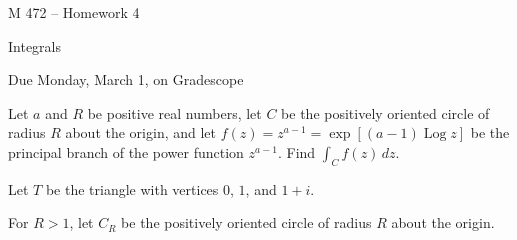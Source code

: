 \documentclass[11pt]{exam}
\newcommand{\ds}{\displaystyle}
\DeclareMathOperator{\Log}{Log}
\begin{document}
\centerline{\Large M 472 -- Homework 4}
\vspace{2ex}
\centerline{\Large Integrals}
\vspace{3ex}
\centerline{Due Monday, March 1, on Gradescope}
\vspace{3ex}
\thispagestyle{empty}
\begin{questions}
  \question Let $a$ and $R$ be positive real numbers, let $C$ be
  the positively oriented circle of radius $R$ about the origin, and
  let $f(z) = z^{a-1} = \exp[(a-1) \Log z]$ be the principal branch of
  the power function $z^{a-1}$. Find $\ds \int_C f(z) \, dz$.
  
  \question Let $T$ be the triangle with vertices $0$, $1$, and
  $1+i$.

  \question For $R>1$, let $C_R$ be the positively oriented circle of
  radius $R$ about the origin.
  
\end{questions}
\end{document}
